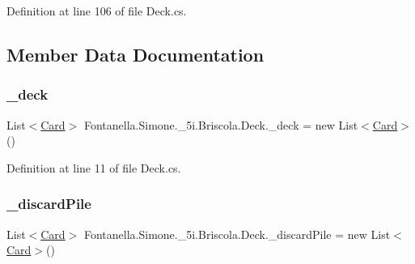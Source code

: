 Definition at line 106 of file Deck.\+cs.



\subsection{Member Data Documentation}
\hypertarget{class_fontanella_1_1_simone_1_1__5i_1_1_briscola_1_1_deck_a5dc9a572ca0d289f9726513ecdaf5203}{}\label{class_fontanella_1_1_simone_1_1__5i_1_1_briscola_1_1_deck_a5dc9a572ca0d289f9726513ecdaf5203} 
\subsubsection{\texorpdfstring{\+\_\+deck}{\_deck}}
{\footnotesize\ttfamily List$<$\hyperlink{class_fontanella_1_1_simone_1_1__5i_1_1_briscola_1_1_card}{Card}$>$ Fontanella.\+Simone.\+\_\+5i.\+Briscola.\+Deck.\+\_\+deck = new List$<$\hyperlink{class_fontanella_1_1_simone_1_1__5i_1_1_briscola_1_1_card}{Card}$>$()}



Definition at line 11 of file Deck.\+cs.

\hypertarget{class_fontanella_1_1_simone_1_1__5i_1_1_briscola_1_1_deck_a065f7dd81106ac0d3856034059a02977}{}\label{class_fontanella_1_1_simone_1_1__5i_1_1_briscola_1_1_deck_a065f7dd81106ac0d3856034059a02977} 
\subsubsection{\texorpdfstring{\+\_\+discard\+Pile}{\_discardPile}}
{\footnotesize\ttfamily List$<$\hyperlink{class_fontanella_1_1_simone_1_1__5i_1_1_briscola_1_1_card}{Card}$>$ Fontanella.\+Simone.\+\_\+5i.\+Briscola.\+Deck.\+\_\+discard\+Pile = new List$<$\hyperlink{class_fontanella_1_1_simone_1_1__5i_1_1_briscola_1_1_card}{Card}$>$()}



